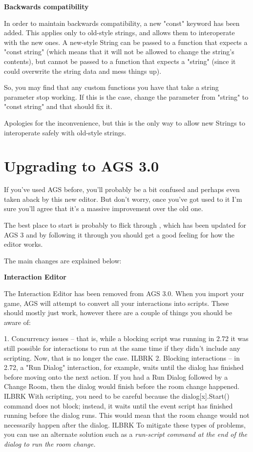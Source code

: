 \bf{Backwards compatibility}

In order to maintain backwards compatibility, a new "const" keyword has been added. This
applies only to old-style strings, and allows them to interoperate with the new ones. A
new-style String can be passed to a function that expects a "const string" (which means
that it will not be allowed to change the string's contents), but cannot be passed to a
function that expects a "string" (since it could overwrite the string data and mess things up).

So, you may find that any custom functions you have that take a string parameter stop
working. If this is the case, change the parameter from "string" to "const string" and
that should fix it.

Apologies for the inconvenience, but this is the only way to allow new Strings to
interoperate safely with old-style strings.


\chapter{Upgrading to AGS 3.0}\label{UpgradeTo30}%

If you've used AGS before, you'll probably be a bit confused and perhaps even
taken aback by this new editor. But don't worry, once you've got used to it
I'm sure you'll agree that it's a massive improvement over the old one.

The best place to start is probably to flick through ,
which has been updated for AGS 3 and by following it through you should
get a good feeling for how the editor works.

The main changes are explained below:

\bf{Interaction Editor}

The Interaction Editor has been removed from AGS 3.0. When you import your game, AGS
will attempt to convert all your interactions into scripts. These should mostly
just work, however there are a couple of things you should be aware of:

1. Concurrency issues -- that is, while a blocking script was running in 2.72
it was still possible for interactions to run at the same time if they didn't
include any scripting. Now, that is no longer the case. ILBRK
2. Blocking interactions -- in 2.72, a "Run Dialog" interaction, for example,
waits until the dialog has finished before moving onto the next action. If you
had a Run Dialog followed by a Change Room, then the dialog would finish before
the room change happened. ILBRK
With scripting, you need to be careful because the dialog[x].Start() command
does not block; instead, it waits until the event script has finished running
before the dialog runs. This would mean that the room change would not
necessarily happen after the dialog. ILBRK
To mitigate these types of problems, you can use an alternate solution such
as a \it{run-script} command at the end of the dialog to run the room change.


